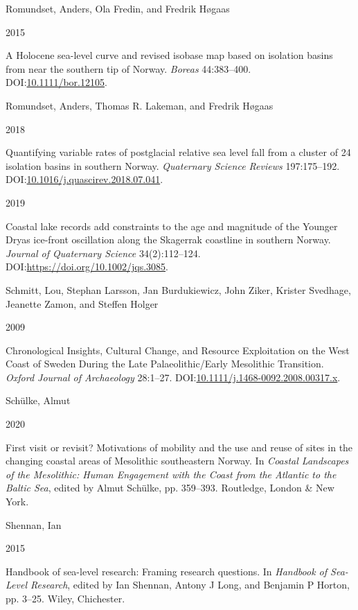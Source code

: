 \documentclass[
]{article}
\newlength{\cslhangindent}
\newlength{\csllabelwidth}
\newlength{\cslentryspacingunit} %
\newenvironment{CSLReferences}[2] %
 {%
  \setlength{\parindent}{0pt}
  \ifodd #1
  \let\oldpar\par
  \def\par{\hangindent=\cslhangindent\oldpar}
  \fi
  \setlength{\parskip}{#2\cslentryspacingunit}
 }%
 {}
\newcommand{\CSLBlock}[1]{#1\hfill\break}
\newcommand{\CSLLeftMargin}[1]{\parbox[t]{\csllabelwidth}{#1}}
\newcommand{\CSLRightInline}[1]{\parbox[t]{\linewidth - \csllabelwidth}{#1}\break}
\begin{document}
\begin{CSLReferences}{0}{0}
\leavevmode{}%
\CSLBlock{Romundset, Anders, Ola Fredin, and Fredrik Høgaas}
\CSLLeftMargin{ 2015}
\CSLRightInline{A Holocene sea{-}level curve and revised isobase map based on isolation basins from near the southern tip of Norway. \emph{Boreas} 44:383--400. DOI:\href{https://doi.org/10.1111/bor.12105}{10.1111/bor.12105}.}

\leavevmode{}%
\CSLBlock{Romundset, Anders, Thomas R. Lakeman, and Fredrik Høgaas}
\CSLLeftMargin{ 2018}
\CSLRightInline{Quantifying variable rates of postglacial relative sea level fall from a cluster of 24 isolation basins in southern Norway. \emph{Quaternary Science Reviews} 197:175--192. DOI:\href{https://doi.org/10.1016/j.quascirev.2018.07.041}{10.1016/j.quascirev.2018.07.041}.}

\leavevmode{}%
\CSLLeftMargin{ 2019 }
\CSLRightInline{Coastal lake records add constraints to the age and magnitude of the Younger Dryas ice-front oscillation along the Skagerrak coastline in southern Norway. \emph{Journal of Quaternary Science} 34(2):112--124. DOI:\url{https://doi.org/10.1002/jqs.3085}.}

\leavevmode{}%
\CSLBlock{Schmitt, Lou, Stephan Larsson, Jan Burdukiewicz, John Ziker, Krister Svedhage, Jeanette Zamon, and Steffen Holger}
\CSLLeftMargin{ 2009}
\CSLRightInline{Chronological Insights, Cultural Change, and Resource Exploitation on the West Coast of Sweden During the Late Palaeolithic/Early Mesolithic Transition. \emph{Oxford Journal of Archaeology} 28:1--27. DOI:\href{https://doi.org/10.1111/j.1468-0092.2008.00317.x}{10.1111/j.1468-0092.2008.00317.x}.}

\leavevmode{}%
\CSLBlock{Schülke, Almut}
\CSLLeftMargin{ 2020}
\CSLRightInline{{First visit or revisit? Motivations of mobility and the use and reuse of sites in the changing coastal areas of Mesolithic southeastern Norway}. In \emph{{Coastal Landscapes of the Mesolithic: Human Engagement with the Coast from the Atlantic to the Baltic Sea}}, edited by Almut Schülke, pp. 359--393. Routledge, London \& New York.}

\leavevmode{}%
\CSLBlock{Shennan, Ian}
\CSLLeftMargin{ 2015}
\CSLRightInline{Handbook of sea-level research: Framing research questions. In \emph{{Handbook of Sea-Level Research}}, edited by Ian Shennan, Antony J Long, and Benjamin P Horton, pp. 3--25. Wiley, Chichester.}


\end{CSLReferences}
\end{document}

